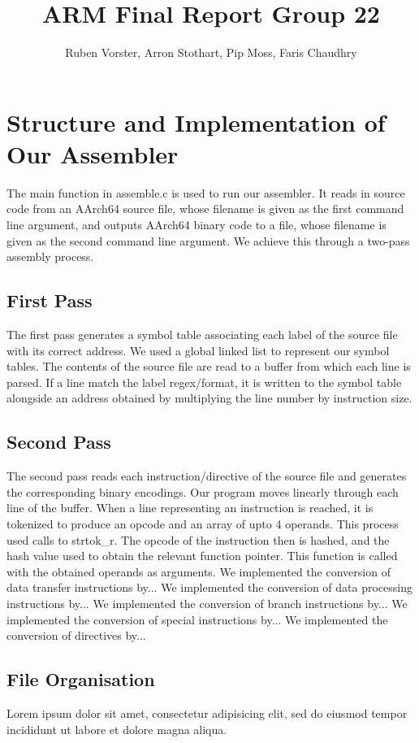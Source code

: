 \documentclass[11pt]{article}
\date{}
\begin{document}
\title{ARM Final Report Group 22}
\author{Ruben Vorster, Arron Stothart, Pip Moss, Faris Chaudhry}

\maketitle

\section{Structure and Implementation of Our Assembler}
The main function in assemble.c is used to run our assembler. It reads in source code from an AArch64 source file, whose filename is given as the first command line argument, and outputs AArch64 binary code to a file, whose filename is given as the second command line argument. We achieve this through a two-pass assembly process. 
\subsection{First Pass}
The first pass generates a symbol table associating each label of the source file with its correct address. We used a global linked list to represent our symbol tables. The contents of the source file are read to a buffer from which each line is parsed. If a line match the label regex/format, it is written to the symbol table alongside an address obtained by multiplying the line number by instruction size. 
\subsection{Second Pass}
The second pass reads each instruction/directive of the source file and generates the corresponding binary encodings. Our program moves linearly through each line of the buffer. When a line representing an instruction is reached, it is tokenized to produce an opcode and an array of upto 4 operands. This process used calls to strtok\_r. The opcode of the instruction then is hashed, and the hash value used to obtain the relevant function pointer. This function is called with the obtained operands as arguments.
We implemented the conversion of data transfer instructions by... 
We implemented the conversion of data processing instructions by... 
We implemented the conversion of branch instructions by... 
We implemented the conversion of special instructions by... 
We implemented the conversion of directives by... 

\subsection{File Organisation}
Lorem ipsum dolor sit amet, consectetur adipisicing elit, sed do eiusmod tempor
incididunt ut labore et dolore magna aliqua.
\end{document}

